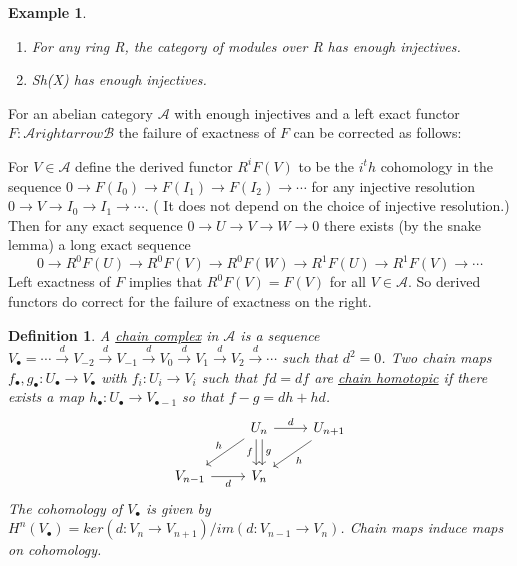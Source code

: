 \documentclass{book}
\newtheorem{definition}[theorem]{Definition}
\newtheorem{example}{Example}[section]
\begin{document}
\begin{example}
\begin{enumerate}
\item For any ring R, the category of modules over R has enough injectives.
\item Sh(X) has enough injectives.
\end{enumerate}
\end{example}

For an abelian category $\mathcal{A}$ with enough injectives and a left exact functor $F:\mathcal{A} rightarrow \mathcal{B}$ the failure of exactness of $F$ can be corrected as follows:

For $V\in \mathcal{A}$ define the derived functor $R^iF(V)$ to be the $i^th$ cohomology in the sequence $0\rightarrow F(I_0) \rightarrow F(I_1) \rightarrow F(I_2) \rightarrow \cdots$ for any injective resolution $0 \rightarrow V \rightarrow I_0 \rightarrow I_1 \rightarrow \cdots$. ( It does not depend on the choice of injective resolution.) Then for any exact sequence $0 \rightarrow U \rightarrow V \rightarrow W \rightarrow 0$ there exists (by the snake lemma) a long exact sequence $$0\rightarrow R^0F(U) \rightarrow R^0F(V) \rightarrow R^0F(W) \rightarrow R^1F(U)\rightarrow R^1F(V) \rightarrow \cdots$$
Left exactness of $F$ implies that $R^0F(V)=F(V)$ for all $V\in \mathcal{A}$. So derived functors do correct for the failure of exactness on the right. 

\begin{definition}
A \underline{chain complex} in $\mathcal{A}$ is a sequence $V_{\bullet} = \cdots \xrightarrow{d} V_{-2}\xrightarrow{d} V_{-1}\xrightarrow{d} V_{0} \xrightarrow{d} V_{1}\xrightarrow{d} V_{2} \xrightarrow{d} \cdots$ such that $d^2=0$.
Two chain maps $f_{\bullet}, g_{\bullet} : U_{\bullet} \rightarrow V_{\bullet}$ with $f_i:U_i \rightarrow V_i$ such that $fd=df$ are \underline{chain homotopic} if there exists a map $h_{\bullet} : U_{\bullet} \rightarrow V_{\bullet -1}$ so that $f-g = dh+hd$.
$$\begin{tikzcd}
         &U_n \arrow{r}{d} \arrow[d ,"f"', shift right=.5ex] \arrow[d ,"g", shift left=.5ex]  \arrow[dl,"h"'] & U_{n+1} \arrow[dl, "h"]  \\
	V_{n-1} \arrow[r,"d"'] & V_n & 
            \end{tikzcd}$$ 
The cohomology of $V_{\bullet}$ is given by $H^n(V_{\bullet})=ker(d:V_n \rightarrow V_{n+1})/im(d: V_{n-1} \rightarrow V_n)$. Chain maps induce maps on cohomology. 

\end{definition}
\end{document}
